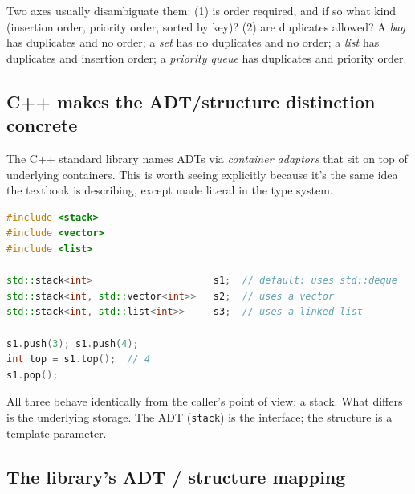 \documentclass[11pt]{article}
\begin{document}
\begin{notebox}
Two axes usually disambiguate them: (1) is order required, and if so
what kind (insertion order, priority order, sorted by key)? (2) are
duplicates allowed? A \emph{bag} has duplicates and no order; a
\emph{set} has no duplicates and no order; a \emph{list} has duplicates
and insertion order; a \emph{priority queue} has duplicates and
priority order.
\end{notebox}

\subsection{C++ makes the ADT/structure distinction concrete}

The C++ standard library names ADTs via \emph{container adaptors}
that sit on top of underlying containers. This is worth seeing
explicitly because it's the same idea the textbook is describing,
except made literal in the type system.

\begin{examplebox}
\begin{lstlisting}[basicstyle=\ttfamily\small,frame=single,language=C++]
#include <stack>
#include <vector>
#include <list>

std::stack<int>                     s1;  // default: uses std::deque
std::stack<int, std::vector<int>>   s2;  // uses a vector
std::stack<int, std::list<int>>     s3;  // uses a linked list

s1.push(3); s1.push(4);
int top = s1.top();  // 4
s1.pop();
\end{lstlisting}
All three behave identically from the caller's point of view: a
stack. What differs is the underlying storage. The ADT (\texttt{stack})
is the interface; the structure is a template parameter.
\end{examplebox}

\subsection*{The library's ADT / structure mapping}
\end{document}
